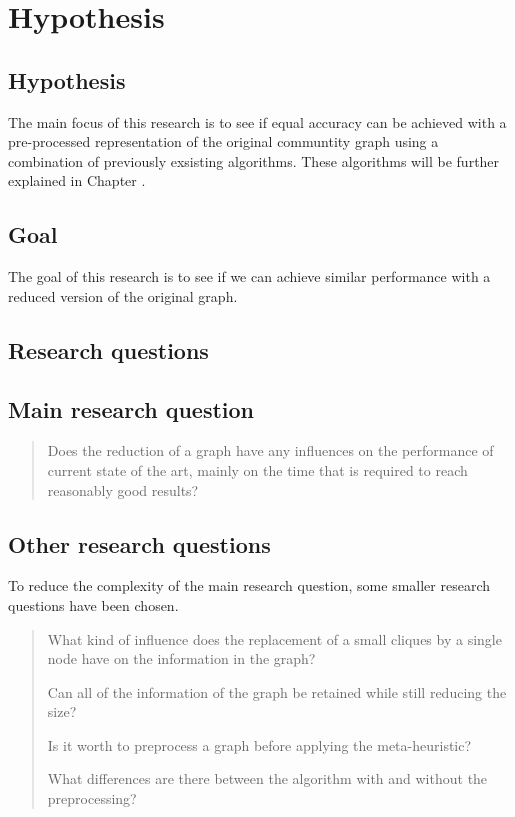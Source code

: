 \section{Hypothesis}
\label{chapter:hypothesis}

\subsection{Hypothesis}
The main focus of this research is to see if equal accuracy can be achieved with a pre-processed representation of the original communtity graph using a combination of previously exsisting algorithms.
These algorithms will be further explained in Chapter \cite{chapter:relevantResearch}.


\subsection{Goal}
The goal of this research is to see if we can achieve similar performance with a reduced version of the original graph.


\subsection{Research questions}
\subsection*{Main research question}
\begin{quote}
Does the reduction of a graph have any influences on the performance of current state of the art, mainly on the time that is required to reach reasonably good results?
\end{quote}
\subsection*{Other research questions}
To reduce the complexity of the main research question, some smaller research questions have been chosen.
\begin{quote}
What kind of influence does the replacement of a small cliques by a single node have on the information in the graph?

Can all of the information of the graph be retained while still reducing the size?

Is it worth to preprocess a graph before applying the meta-heuristic?

What differences are there between the algorithm with and without the preprocessing?
\end{quote}
